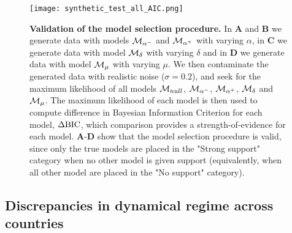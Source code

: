 \begin{figure}
  \centering
  \texttt{[image: synthetic\_test\_all\_AIC.png]}
  \caption{\small
  \textbf{Validation of the model selection procedure.} In \textbf{A} and $\textbf{B}$ we generate data with models $\mathcal{M}_{\alpha^-}$ and $\mathcal{M}_{\alpha^+}$ with varying $\alpha$, in \textbf{C} we generate data with model $\mathcal{M}_\delta$ with varying $\delta$ and in \textbf{D} we generate data with model $\mathcal{M}_\mu$ with varying $\mu$. We then contaminate the generated data with realistic noise ($\sigma = 0.2$), and seek for the maximum likelihood of all models $\mathcal{M}_{null}$, $\mathcal{M}_{\alpha^-}$, $\mathcal{M}_{\alpha^+}$, $\mathcal{M}_\delta$ and $\mathcal{M}_\mu$. The maximum likelihood of each model is then used to compute difference in Bayesian Information Criterion for each model, $\Delta \text{BIC}$, which comparison provides a strength-of-evidence for each model. 
  \textbf{A}-\textbf{D} show that the model selection procedure is valid, since only the true models are placed in the "Strong support" category when no other model is given support (equivalently, when all other model are placed in the "No support" category).}
  \label{fig:synthetic_test_all_AIC}
\end{figure}
\FloatBarrier

\subsection{Discrepancies in dynamical regime across countries}

